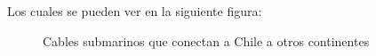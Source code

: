 \documentclass{article}
\begin{document}
Los cuales se pueden ver en la siguiente figura:


\begin{figure}[H]
\centering
\setlength\fboxsep{0pt}
\setlength\fboxrule{0.5pt}
\caption{Cables submarinos que conectan a Chile a otros continentes}
\label{fig:cables submarinos}
\end{figure}
\end{document}
